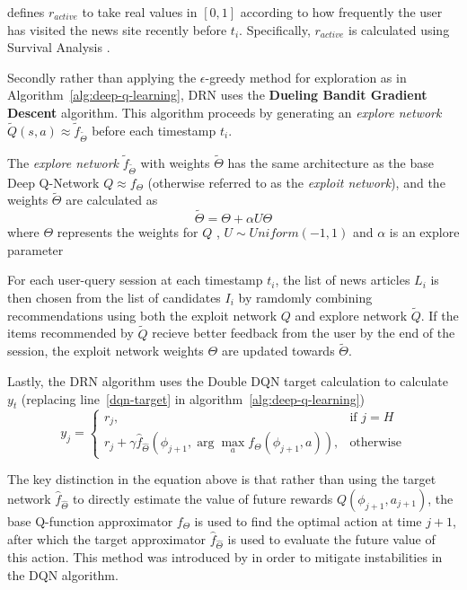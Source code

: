 \documentclass{mldsmsc}
\begin{document}
\cite{RefWorks:zheng2018drn:} defines $r_{active}$ to take real values in $[0,1]$ according to how frequently
the user has visited the news site recently before $t_i$. Specifically, $r_{active}$ is calculated using
Survival Analysis \citep{ibrahim2001bayesian,jing2017neural}. 

Secondly rather than applying the
$\epsilon$-greedy method for exploration as in Algorithm~\ref{alg:deep-q-learning}, DRN uses the \textbf{Dueling Bandit Gradient Descent} algorithm.
This algorithm proceeds by generating an \emph{explore network} $\tilde{Q}(s,a) \approx \tilde{f}_{\tilde{\Theta}}$ before each timestamp $t_i$.

\begin{definition}
The \emph{explore network} $\tilde{f}_{\tilde{\Theta}}$ with weights $\tilde{\Theta}$ has the same architecture
as the base Deep Q-Network $Q \approx f_{\Theta}$ (otherwise referred to as the \emph{exploit network}), and
the weights $\tilde{\Theta}$ are calculated as
\begin{equation*}
\tilde{\Theta} = \Theta + \alpha U \Theta
\end{equation*}
where $\Theta$ represents the weights for $Q$ , $U \sim Uniform(-1,1)$ and $\alpha$ is an explore parameter
\end{definition}

For each user-query session at each timestamp $t_i$, the list of news articles $L_i$ is then chosen
from the list of candidates $I_i$ by ramdomly combining recommendations using both the exploit network
$Q$ and explore network $\tilde{Q}$. If the items recommended by $\tilde{Q}$ recieve better feedback from
the user by the end of the session, the exploit network weights $\Theta$ are updated towards $\tilde{\Theta}$.

Lastly, the DRN algorithm uses the Double DQN target calculation to calculate $y_t$ (replacing line~\ref{dqn-target} in algorithm~\ref{alg:deep-q-learning})
\begin{equation}
    \label{eqn:ddqn}
    y_j = 
    \begin{cases} 
        r_j, & \text{if } j=H\\ 
        r_j + \gamma \hat{f}_{\hat{\Theta}}(\phi_{j+1},\arg \max_{a}f_{\Theta}(\phi_{j+1},a)), & \text{otherwise} 
    \end{cases}
\end{equation}

The key distinction in the equation above is that rather than using the target network $\hat{f}_{\hat{\Theta}}$ to directly
estimate the value of future rewards $Q(\phi_{j+1},a_{j+1})$, the base Q-function approximator $f_{\Theta}$ is used to
find the optimal action at time $j+1$, after which the target approximator $\hat{f}_{\hat{\Theta}}$ is used
to evaluate the future value of this action. This method was introduced by \cite{RefWorks:van2016deep} in order
to mitigate instabilities in the DQN algorithm.
\end{document}
